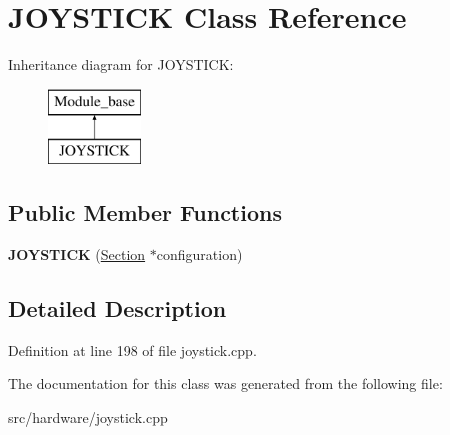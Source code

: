 \hypertarget{classJOYSTICK}{\section{J\-O\-Y\-S\-T\-I\-C\-K Class Reference}
\label{classJOYSTICK}
}
Inheritance diagram for J\-O\-Y\-S\-T\-I\-C\-K\-:\begin{figure}[H]
\begin{center}
\leavevmode
\includegraphics[height=2.000000cm]{classJOYSTICK}
\end{center}
\end{figure}
\subsection*{Public Member Functions}
\begin{DoxyCompactItemize}
\item 
\hypertarget{classJOYSTICK_a0514bda9906877426a42ab28f36154c1}{{\bfseries J\-O\-Y\-S\-T\-I\-C\-K} (\hyperlink{classSection}{Section} $\ast$configuration)}\label{classJOYSTICK_a0514bda9906877426a42ab28f36154c1}

\end{DoxyCompactItemize}


\subsection{Detailed Description}


Definition at line 198 of file joystick.\-cpp.



The documentation for this class was generated from the following file\-:\begin{DoxyCompactItemize}
\item 
src/hardware/joystick.\-cpp\end{DoxyCompactItemize}
